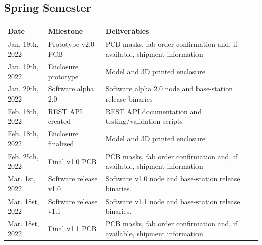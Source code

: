 \documentclass{article}
\begin{document}
\subsection{Spring Semester}
%
%
\begin{table}[H]
    \begin{tabularx}{\linewidth}{|X|X|X|}
        \hline
        Date & Milestone & Deliverables \\
        \hline\hline
        Jan. 19th, 2022 
        & Prototype v2.0 PCB 
        & PCB masks, fab order confirmation and, if available, shipment information \\
        
        \hline
        Jan. 19th, 2022
        & Enclosure prototype
        & Model and 3D printed enclosure
        \\
        
        \hline
        Jan. 29th, 2022 
        & Software alpha 2.0 
        & Software alpha 2.0 node and base-station release binaries
        \\
        
        \hline
        Feb. 18th, 2022
        & REST API created
        & REST API documentation and testing/validation scripts
        \\
        
        \hline
        Feb. 18th, 2022
        & Enclosure finalized
        & Model and 3D printed enclosure
        \\
        
        \hline
        Feb. 25th, 2022
        & Final v1.0 PCB
        & PCB masks, fab order confirmation and, if available, shipment information 
        \\
        
        \hline
        Mar. 1st, 2022
        & Software release v1.0
        & Software v1.0 node and base-station release binaries. 
        \\ 
        
        \hline
        Mar. 18st, 2022
        & Software release v1.1
        & Software v1.1 node and base-station release binaries. 
        \\ 
        
        \hline
        Mar. 18st, 2022
        & Final v1.1 PCB
        & PCB masks, fab order confirmation and, if available, shipment information 
        \\
        

\end{tabularx}
\end{table}
\end{document}
